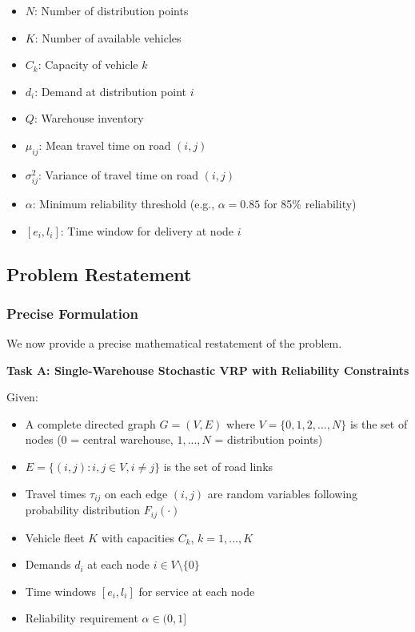 \begin{itemize}
\item $N$: Number of distribution points
\item $K$: Number of available vehicles
\item $C_k$: Capacity of vehicle $k$
\item $d_i$: Demand at distribution point $i$
\item $Q$: Warehouse inventory
\item $\mu_{ij}$: Mean travel time on road $(i,j)$
\item $\sigma_{ij}^2$: Variance of travel time on road $(i,j)$
\item $\alpha$: Minimum reliability threshold (e.g., $\alpha = 0.85$ for 85\% reliability)
\item $[e_i, l_i]$: Time window for delivery at node $i$
\end{itemize}

\subsection{Problem Restatement}

\subsubsection{Precise Formulation}

We now provide a precise mathematical restatement of the problem.

\textbf{Task A: Single-Warehouse Stochastic VRP with Reliability Constraints}

Given:
\begin{itemize}
\item A complete directed graph $G = (V, E)$ where $V = \{0, 1, 2, ..., N\}$ is the set of nodes (0 = central warehouse, $1, ..., N$ = distribution points)
\item $E = \{(i,j) : i, j \in V, i \neq j\}$ is the set of road links
\item Travel times $\tau_{ij}$ on each edge $(i,j)$ are random variables following probability distribution $F_{ij}(\cdot)$
\item Vehicle fleet $K$ with capacities $C_k$, $k = 1, ..., K$
\item Demands $d_i$ at each node $i \in V \setminus \{0\}$
\item Time windows $[e_i, l_i]$ for service at each node
\item Reliability requirement $\alpha \in (0,1]$
\end{itemize}

